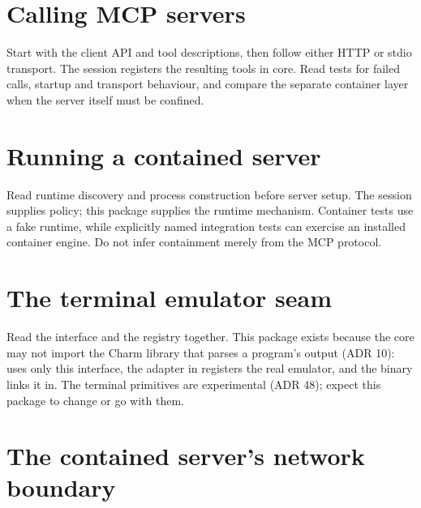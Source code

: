 \chapter{Calling MCP servers}

Start with the client API and tool descriptions, then follow either HTTP or stdio transport. The session registers the resulting tools in core. Read tests for failed calls, startup and transport behaviour, and compare the separate container layer when the server itself must be confined.




\chapter{Running a contained server}

Read runtime discovery and process construction before server setup. The session supplies policy; this package supplies the runtime mechanism. Container tests use a fake runtime, while explicitly named integration tests can exercise an installed container engine. Do not infer containment merely from the MCP protocol.




\chapter{The terminal emulator seam}

Read the interface and the registry together. This package exists because the core may not import the Charm library that parses a program's output (ADR 10):  uses only this interface, the adapter in  registers the real emulator, and the binary links it in. The terminal primitives are experimental (ADR 48); expect this package to change or go with them.


\chapter{The contained server's network boundary}

